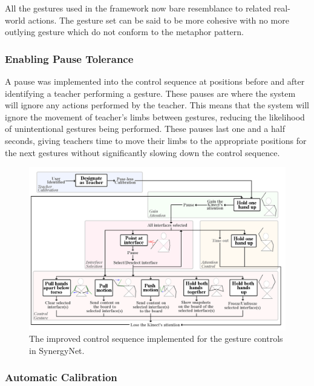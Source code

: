 \documentclass[link]{IWCOMP}
\begin{document}
All the gestures used in the framework now bare resemblance to related real-world actions.
The gesture set can be said to be more cohesive with no more outlying gesture which do not conform to the metaphor pattern.

\subsubsection{Enabling Pause Tolerance}  
\label{subsubsec:studyImplementationPauseTolerance}

A pause was implemented into the control sequence at positions before and after identifying a teacher performing a gesture.
These pauses are where the system will ignore any actions performed by the teacher.
This means that the system will ignore the movement of teacher's limbs between gestures, reducing the likelihood of unintentional gestures being performed.
These pauses last one and a half seconds, giving teachers time to move their limbs to the appropriate positions for the next gestures without significantly slowing down the control sequence.

\begin{figure}[t]
  \centering
  \includegraphics[width=1\textwidth]{figures/control_sequence_flow_diagram.png}
  \caption{The improved control sequence implemented for the gesture controls in SynergyNet.}
  \label{fig:controlSequenceFlowDiagram}
\end{figure}

\subsubsection{Automatic Calibration}  
\label{subsubsec:studyImplementationAutoCalibration}
\end{document}
